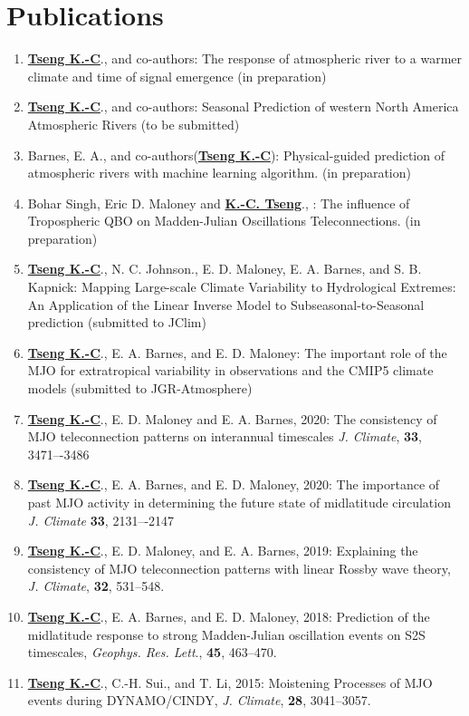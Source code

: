 \documentclass{article}
\begin{document}
\section{\color{airforceblue}Publications}
\begin{enumerate}
	\item \normalsize{\bf{\underline{Tseng K.-C}}}., and co-authors: The response of atmospheric river to a warmer climate and time of signal emergence (in preparation) \par
    \item \normalsize{\bf{\underline{Tseng K.-C}}}., and co-authors: Seasonal Prediction of western North America Atmospheric Rivers (to be submitted)\par
	\item Barnes, E. A., and co-authors(\normalsize{\bf{\underline{Tseng K.-C}}}): Physical-guided prediction of atmospheric rivers with machine learning algorithm. (in preparation)  \par
	\item Bohar Singh, Eric D. Maloney and \normalsize{\bf{\underline{K.-C. Tseng}}}., : The influence of Tropospheric QBO on Madden-Julian Oscillations Teleconnections. (in preparation)  \par 
	\item \normalsize{\bf{\underline{Tseng K.-C}}}., N. C. Johnson., E. D. Maloney, E. A. Barnes, and S. B. Kapnick: Mapping Large-scale Climate Variability to Hydrological Extremes: An Application of the Linear Inverse Model to Subseasonal-to-Seasonal prediction (submitted to JClim) 	
	\item \normalsize{\bf{\underline{Tseng K.-C}}}., E. A. Barnes, and E. D. Maloney: The important role of the MJO for extratropical variability in observations and the CMIP5 climate models (submitted to JGR-Atmosphere)   
	\item \normalsize{\bf{\underline{Tseng K.-C}}}., E. D. Maloney and E. A. Barnes, 2020: The consistency of MJO teleconnection patterns on interannual timescales \textit{J. Climate}, \normalsize{\bf{33}}, 3471–-3486
	\item \normalsize{\bf{\underline{Tseng K.-C}}}., E. A. Barnes, and E. D. Maloney, 2020: The importance of past MJO activity in determining the future state of midlatitude circulation  \textit{J. Climate} \normalsize{\bf{33}}, 2131–-2147
	\item \normalsize{\bf{\underline{Tseng K.-C}}}., E. D. Maloney, and E. A. Barnes, 2019: Explaining the consistency of MJO teleconnection patterns with linear Rossby wave theory, \textit{J. Climate}, \normalsize{\bf{32}}, 531--548.
	\item \normalsize{\bf{\underline{Tseng K.-C}}}., E. A. Barnes, and E. D. Maloney, 2018: Prediction of the midlatitude response to strong Madden-Julian oscillation events on S2S timescales, \textit{Geophys. Res. Lett}., \normalsize{\bf{45}}, 463--470. \par
	\item \normalsize{\bf{\underline{Tseng K.-C}}}., C.-H. Sui., and T. Li, 2015: Moistening Processes of MJO events during DYNAMO/CINDY, \textit{J. Climate}, \normalsize{\bf{28}}, 3041--3057.
    \end{enumerate}
\end{document}
